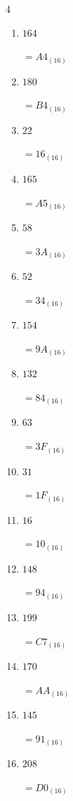 \begin{multicols}{4}
\begin{enumerate}
\columnbreak %

  \item $164$

        $=A4_{(16)}$

  \item $180$

        $=B4_{(16)}$

  \item $22$

        $=16_{(16)}$

  \item $165$

        $=A5_{(16)}$

  \item $58$

        $=3A_{(16)}$

  \item $52$

        $=34_{(16)}$

  \item $154$

        $=9A_{(16)}$

  \item $132$

        $=84_{(16)}$

  \item $63$

        $=3F_{(16)}$

  \item $31$

        $=1F_{(16)}$

  \item $16$

        $=10_{(16)}$

  \item $148$

        $=94_{(16)}$

  \item $199$

        $=C7_{(16)}$

  \item $170$

        $=AA_{(16)}$

  \item $145$

        $=91_{(16)}$

\columnbreak %

  \item $208$

        $=D0_{(16)}$


\end{enumerate}
\end{multicols}
